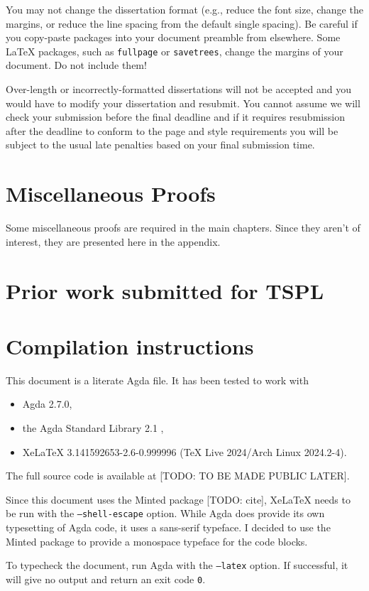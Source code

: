\documentclass[logo,bsc,singlespacing,parskip,online]{infthesis}
\begin{document}
You may not change the dissertation format (e.g., reduce the font size, change
the margins, or reduce the line spacing from the default single spacing). Be
careful if you copy-paste packages into your document preamble from elsewhere.
Some \LaTeX{} packages, such as \texttt{fullpage} or \texttt{savetrees}, change
the margins of your document. Do not include them!

Over-length or incorrectly-formatted dissertations will not be accepted and you
would have to modify your dissertation and resubmit. You cannot assume we will
check your submission before the final deadline and if it requires resubmission
after the deadline to conform to the page and style requirements you will be
subject to the usual late penalties based on your final submission time.





\appendix

\chapter{Miscellaneous Proofs}
\label{appendix:misc_proofs}

Some miscellaneous proofs are required in the main chapters. Since they aren't of interest, they are presented here in the appendix.



\chapter{Prior work submitted for TSPL}
\label{appendix:tspl}


\chapter{Compilation instructions}
\label{appendix:compilation_instructions}

This document is a literate Agda file. It has been tested to work with
\begin{itemize}
  \item Agda 2.7.0,
  \item the Agda Standard Library 2.1 \citep{the_agda_community_agda_2024},
  \item XeLaTeX 3.141592653-2.6-0.999996 (TeX Live 2024/Arch Linux 2024.2-4).
\end{itemize}

The full source code is available at [TODO: TO BE MADE PUBLIC LATER].

Since this document uses the Minted package [TODO: cite], XeLaTeX needs to be run with the
\texttt{--shell-escape} option. While Agda does provide its own typesetting of Agda code, it uses a
sans-serif typeface. I decided to use the Minted package to provide a monospace typeface for the
code blocks.

To typecheck the document, run Agda with the \texttt{--latex} option. If successful, it will give no
output and return an exit code \texttt{0}.
\end{document}

